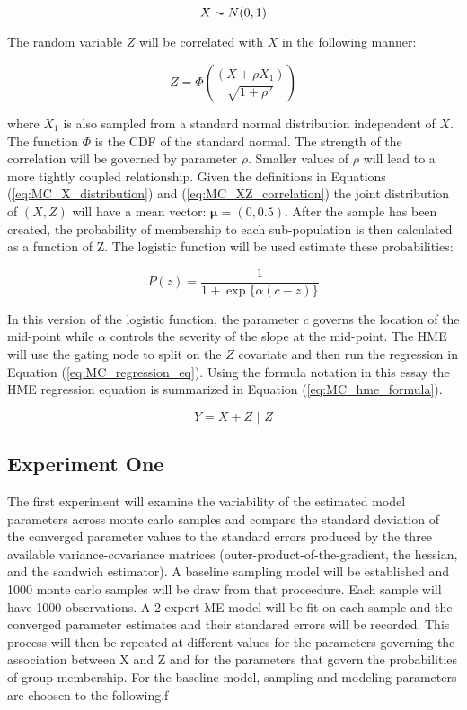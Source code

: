 \documentclass[12pt]{article}
\theoremstyle{definition}
\begin{document}
\begin{equation} \label{eq:MC_X_distribution}
    X \thicksim N(0, 1)
\end{equation}

The random variable $Z$ will be correlated with $X$ in the following manner:

\begin{equation} \label{eq:MC_XZ_correlation}
    Z = \Phi \left( \frac{(X + \rho X_{1})}{\sqrt{1 + \rho^{2}}} \right)
\end{equation}

where $X_{1}$ is also sampled from a standard normal distribution independent of $X$. The function $\Phi$ is the CDF of the standard normal. The strength of the correlation will be governed by parameter $\rho$. Smaller values of $\rho$ will lead to a more tightly coupled relationship. Given the definitions in Equations (\ref{eq:MC_X_distribution}) and (\ref{eq:MC_XZ_correlation}) the joint distribution of $(X, Z)$ will have a mean vector: $\boldsymbol{\mu} = (0, 0.5)$. After the sample has been created, the probability of membership to each sub-population is then calculated as a function of Z. The logistic function will be used estimate these probabilities:

\begin{equation} \label{eq:general_logistic}
    P(z) = \frac{1}{1 + \exp\{\alpha (c - z)\}}
\end{equation}

In this version of the logistic function, the parameter $c$ governs the location of the mid-point while $\alpha$ controls the severity of the slope at the mid-point. The HME will use the gating node to split on the $Z$ covariate and then run the regression in Equation (\ref{eq:MC_regression_eq}). Using the formula notation in this essay the HME regression equation is summarized in Equation (\ref{eq:MC_hme_formula}).

\begin{equation} \label{eq:MC_hme_formula}
    Y = X + Z \,\,|\,\, Z
\end{equation}

\subsection{Experiment One}

The first experiment will examine the variability of the estimated model parameters across monte carlo samples and compare the standard deviation of the converged parameter values to the standard errors produced by the three available variance-covariance matrices (outer-product-of-the-gradient, the hessian, and the sandwich estimator). A baseline sampling model will be established and 1000 monte carlo samples will be draw from that proceedure. Each sample will have 1000 observations. A 2-expert ME model will be fit on each sample and the converged parameter estimates and their standared errors will be recorded. This process will then be repeated at different values for the parameters governing the association between X and Z and for the parameters that govern the probabilities of group membership. For the baseline model, sampling and modeling parameters are choosen to the following.f
\end{document}

